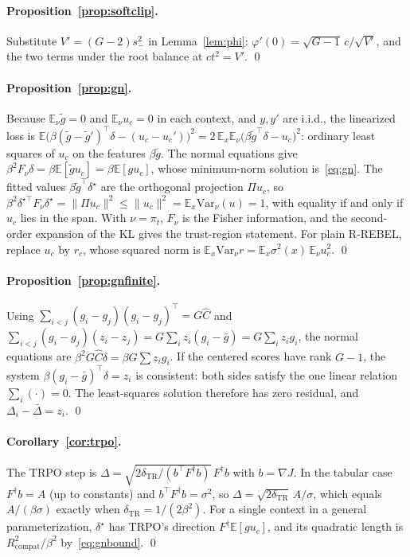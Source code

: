 \documentclass[11pt]{article}
\theoremstyle{definition}
\theoremstyle{remark}
\newcommand{\E}{\mathbb{E}}
\newcommand{\Var}{\mathrm{Var}}
\newcommand{\1}{\mathbb{1}}
\newcommand{\rr}{R-REBEL}
\begin{document}
\paragraph{Proposition~\ref{prop:softclip}.} Substitute $V'=(G-2)s_-^2$ in
Lemma~\ref{lem:phi}: $\varphi'(0)=\sqrt{G-1}\,c/\sqrt{V'}$, and the two terms under the root
balance at $ct^2=V'$. \qed

\paragraph{Proposition~\ref{prop:gn}.} Because $\E_\nu\tilde g=0$ and $\E_\nu u_c=0$ in each
context, and $y,y'$ are i.i.d., the linearized loss is
$\E\bigl(\beta(\tilde g-\tilde g')^\top\delta-(u_c-u_c')\bigr)^2=2\,\E_x\E_\nu\bigl(\beta\tilde g^\top\delta-u_c\bigr)^2$:
ordinary least squares of $u_c$ on the features $\beta\tilde g$. The normal equations give
$\beta^2F_\nu\delta=\beta\E[\tilde gu_c]=\beta\E[gu_c]$, whose minimum-norm solution
is~\eqref{eq:gn}. The fitted values $\beta\tilde g^\top\delta^\star$ are the orthogonal
projection $\Pi u_c$, so $\beta^2\delta^{\star\top}F_\nu\delta^\star=\|\Pi u_c\|^2\le\|u_c\|^2=\E_x\Var_\nu(u)=1$,
with equality if and only if $u_c$ lies in the span. With $\nu=\pi_t$, $F_\nu$ is the Fisher
information, and the second-order expansion of the KL gives the trust-region
statement. For plain \rr{}, replace $u_c$ by $r_c$, whose squared norm is
$\E_x\Var_\nu r=\E_x\sigma^2(x)\,\E_\nu u_c^2$. \qed

\paragraph{Proposition~\ref{prop:gnfinite}.} Using
$\sum_{i<j}(g_i-g_j)(g_i-g_j)^\top=G\hat C$ and
$\sum_{i<j}(g_i-g_j)(z_i-z_j)=G\sum_iz_i(g_i-\bar g)=G\sum_iz_ig_i$, the normal equations are
$\beta^2G\hat C\delta=\beta G\sum z_ig_i$. If the centered scores have rank $G-1$, the system
$\beta(g_i-\bar g)^\top\delta=z_i$ is consistent: both sides satisfy the one linear
relation $\sum_i(\cdot)=0$. The least-squares solution therefore has zero residual,
and $\Delta_i-\bar\Delta=z_i$. \qed

\paragraph{Corollary~\ref{cor:trpo}.} The TRPO step is
$\Delta=\sqrt{2\delta_{\mathrm{TR}}/(b^\top F^\dagger b)}\,F^\dagger b$ with $b=\nabla J$.
In the tabular case $F^\dagger b=A$ (up to constants) and $b^\top F^\dagger b=\sigma^2$, so
$\Delta=\sqrt{2\delta_{\mathrm{TR}}}\,A/\sigma$, which equals $A/(\beta\sigma)$ exactly when
$\delta_{\mathrm{TR}}=1/(2\beta^2)$. For a single context in a general parameterization,
$\delta^\star$ has TRPO's direction $F^\dagger\E[gu_c]$, and its quadratic length is
$R^2_{\mathrm{compat}}/\beta^2$ by~\eqref{eq:gnbound}. \qed
\end{document}
